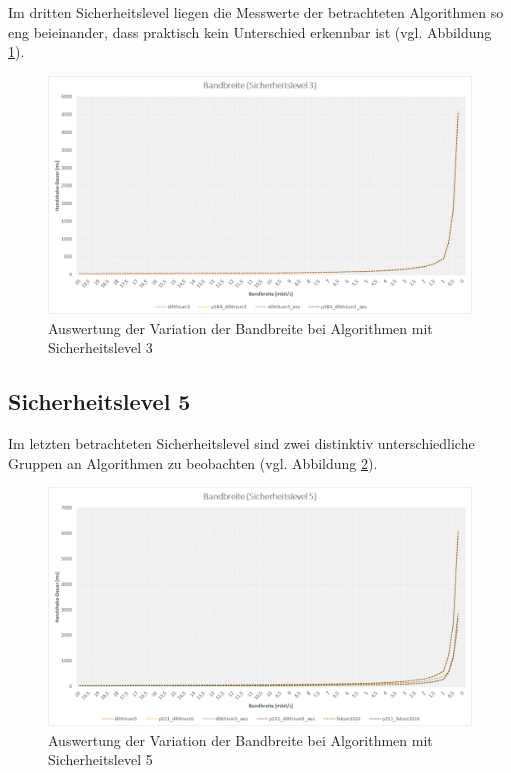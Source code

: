 		Im dritten Sicherheitslevel liegen die Messwerte der betrachteten Algorithmen so eng beieinander, dass praktisch kein Unterschied erkennbar ist (vgl. Abbildung \ref{fig:ergebnis:bandbreite:sl3}).
		
		\begin{figure}[htbp]
			\centering
			\includegraphics[width=\textwidth]{../auswertung/bandbreite_sl3.png}
			\caption{Auswertung der Variation der Bandbreite bei Algorithmen mit Sicherheitslevel 3}
			\label{fig:ergebnis:bandbreite:sl3}
		\end{figure}
		
		\subsection{Sicherheitslevel 5}
		\label{subsec:ergebnis:bandbreite:sl5}
		
		Im letzten betrachteten Sicherheitslevel sind zwei distinktiv unterschiedliche Gruppen an Algorithmen zu beobachten (vgl. Abbildung \ref{fig:ergebnis:bandbreite:sl5}).
		
		\begin{figure}[htbp]
			\centering
			\includegraphics[width=\textwidth]{../auswertung/bandbreite_sl5.png}
			\caption{Auswertung der Variation der Bandbreite bei Algorithmen mit Sicherheitslevel 5}
			\label{fig:ergebnis:bandbreite:sl5}
		\end{figure}
		
